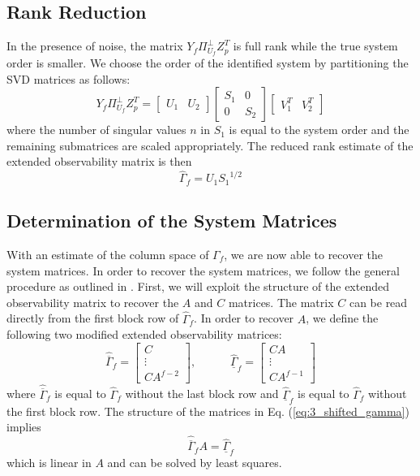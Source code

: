 \subsection{Rank Reduction}\label{sec:3_rank_reduction}
In the presence of noise, the matrix $Y_f\Pi_{U_f}^\perp Z_p^T$ is full rank while the true system order is smaller. We choose the order of the identified system by partitioning the SVD matrices as follows:
\begin{equation*}
Y_f\Pi_{U_f}^\perp Z_p^T = 
\begin{bmatrix}U_1 & U_2\end{bmatrix}
\begin{bmatrix}S_1 & 0\\ 0 & S_2\end{bmatrix}
\begin{bmatrix}V_1^T & V_2^T\end{bmatrix}
\end{equation*}
where the number of singular values $n$ in $S_1$ is equal to the system order and the remaining submatrices are scaled appropriately. The reduced rank estimate of the extended observability matrix is then
\begin{equation}
\hat{\Gamma}_f = U_1 {S_1}^{1/2}
\end{equation}


\subsection{Determination of the System Matrices}\label{sec:3_system_matrices}
With an estimate of the column space of $\Gamma_f$, we are now able to recover the system matrices. In order to recover the system matrices, we follow the general procedure as outlined in \cite{katayama2005subspace}. First, we will exploit the structure of the extended observability matrix to recover the $A$ and $C$ matrices. The matrix $C$ can be read directly from the first block row of $\hat{\Gamma}_f$. In order to recover $A$, we define the following two modified extended observability matrices:
\begin{equation}\label{eq:3_shifted_gamma}
\hat{\overline{\Gamma}}_f = \begin{bmatrix}C\\ \vdots \\ CA^{f-2}\end{bmatrix}, \hspace{3em}
\hat{\underline{\Gamma}}_f = \begin{bmatrix}CA\\ \vdots \\ CA^{f-1}\end{bmatrix}
\end{equation}
where $\hat{\overline{\Gamma}}_f$ is equal to $\hat{\Gamma}_f$ without the last block row and $\hat{\underline{\Gamma}}_f$ is equal to $\hat{\Gamma}_f$ without the first block row. The structure of the matrices in Eq. (\ref{eq:3_shifted_gamma}) implies
\begin{equation}
\hat{\overline{\Gamma}}_f A = \hat{\underline{\Gamma}}_f
\end{equation}
which is linear in $A$ and can be solved by least squares.

